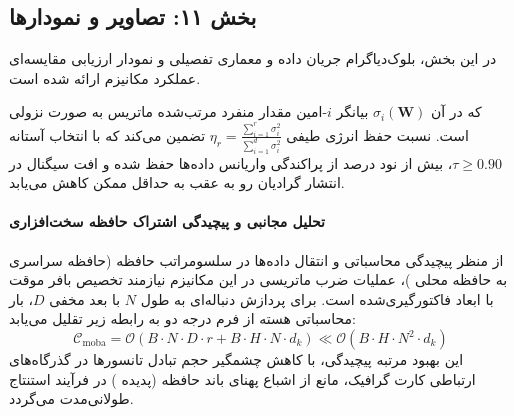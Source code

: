 \subsection*{بخش ۱۱: تصاویر و نمودارها }
در این بخش، بلوک‌دیاگرام جریان داده و معماری تفصیلی و نمودار ارزیابی مقایسه‌ای عملکرد مکانیزم  ارائه شده است.



که در آن $\sigma_i(\mathbf{W})$ بیانگر $i$-امین مقدار منفرد مرتب‌شده ماتریس به صورت نزولی است. نسبت حفظ انرژی طیفی $\eta_r = \frac{\sum_{i=1}^r \sigma_i^2}{\sum_{i=1}^{d} \sigma_i^2}$ تضمین می‌کند که با انتخاب آستانه $\tau \ge 0.90$، بیش از نود درصد از پراکندگی واریانس داده‌ها حفظ شده و افت سیگنال در انتشار گرادیان رو به عقب به حداقل ممکن کاهش می‌یابد.

\paragraph{تحلیل مجانبی و پیچیدگی اشتراک حافظه سخت‌افزاری}
از منظر پیچیدگی محاسباتی و انتقال داده‌ها در سلسومراتب حافظه (حافظه سراسری  به حافظه محلی )، عملیات ضرب ماتریسی در این مکانیزم نیازمند تخصیص بافر موقت با ابعاد فاکتورگیری‌شده است. برای پردازش دنباله‌ای به طول $N$ با بعد مخفی $D$، بار محاسباتی هسته از فرم درجه دو به رابطه زیر تقلیل می‌یابد:
\begin{equation}
\label{eq:complexity_moba}
\mathcal{C}_{\text{moba}} = \mathcal{O}\left( B \cdot N \cdot D \cdot r + B \cdot H \cdot N \cdot d_k \right) \ll \mathcal{O}\left( B \cdot H \cdot N^2 \cdot d_k \right)
\end{equation}
این بهبود مرتبه پیچیدگی، با کاهش چشمگیر حجم تبادل تانسورها در گذرگاه‌های ارتباطی کارت گرافیک، مانع از اشباع پهنای باند حافظه (پدیده ) در فرآیند استنتاج طولانی‌مدت می‌گردد.